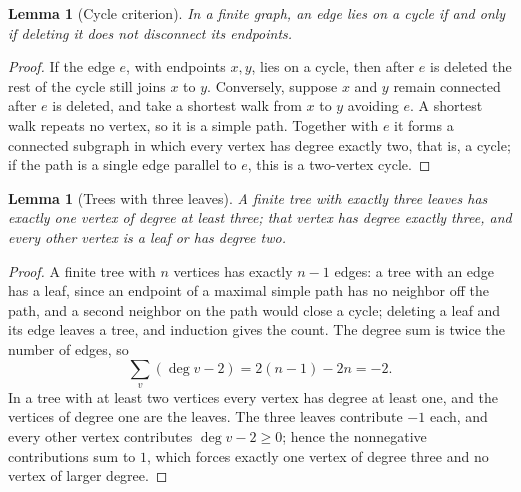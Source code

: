 \documentclass[11pt]{article}
\theoremstyle{mainplain}
\newtheorem{lemma}[theorem]{Lemma}
\theoremstyle{mainroman}
\theoremstyle{definition}
\numberwithin{equation}{section}
\begin{document}
\begin{lemma}[Cycle criterion]\label{lem:cycle-criterion}
In a finite graph, an edge lies on a cycle if and only if deleting it
does not disconnect its endpoints.
\end{lemma}
\begin{proof}
If the edge $e$, with endpoints $x,y$, lies on a cycle, then after $e$
is deleted the rest of the cycle still joins $x$ to $y$. Conversely,
suppose $x$ and $y$ remain connected after $e$ is deleted, and take a
shortest walk from $x$ to $y$ avoiding $e$. A shortest walk repeats no
vertex, so it is a simple path. Together with $e$ it forms a connected
subgraph in which every vertex has degree exactly two, that is, a
cycle; if the path is a single edge parallel to $e$, this is a
two-vertex cycle.
\end{proof}

\begin{lemma}[Trees with three leaves]\label{lem:three-leaf-tree}
A finite tree with exactly three leaves has exactly one vertex of
degree at least three; that vertex has degree exactly three, and every
other vertex is a leaf or has degree two.
\end{lemma}
\begin{proof}
A finite tree with $n$ vertices has exactly $n-1$ edges: a tree with
an edge has a leaf, since an endpoint of a maximal simple path has no
neighbor off the path, and a second neighbor on the path would close a
cycle; deleting a leaf and its edge leaves a tree, and induction gives
the count. The degree sum is twice the number of edges, so
\[
 \sum_v(\deg v-2)=2(n-1)-2n=-2 .
\]
In a tree with at least two vertices every vertex has degree at least
one, and the vertices of degree one are the leaves. The three leaves
contribute $-1$ each, and every other vertex contributes
$\deg v-2\ge0$; hence the nonnegative contributions sum to $1$, which
forces exactly one vertex of degree three and no vertex of larger
degree.
\end{proof}
\end{document}
